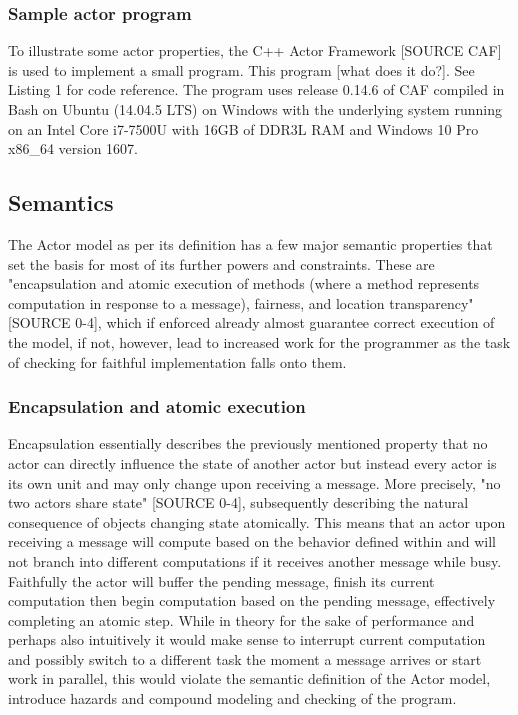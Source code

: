 \documentclass[A4]{article}
\begin{document}
\subsubsection{Sample actor program}
To illustrate some actor properties, the C++ Actor Framework [SOURCE CAF] is used to implement a small program. This program [what does it do?]. See Listing 1 for code reference. The program uses release 0.14.6 of CAF compiled in Bash on Ubuntu (14.04.5 LTS) on Windows with the underlying system running on an Intel Core i7-7500U with 16GB of DDR3L RAM and Windows 10 Pro x86\_64 version 1607. 

\subsection{Semantics}
The Actor model as per its definition has a few major semantic properties that set the basis for most of its further powers and constraints. These are "encapsulation and atomic execution of methods (where a method represents computation in response to a message), fairness, and location transparency" [SOURCE 0-4], which if enforced already almost guarantee correct execution of the model, if not, however, lead to increased work for the programmer as the task of checking for faithful implementation falls onto them. 
\subsubsection{Encapsulation and atomic execution}
Encapsulation essentially describes the previously mentioned property that no actor can directly influence the state of another actor but instead every actor is its own unit and may only change upon receiving a message. More precisely, "no two actors share state" [SOURCE 0-4], subsequently describing the natural consequence of objects changing state atomically. This means that an actor upon receiving a message will compute based on the behavior defined within and will not branch into different computations if it receives another message while busy. Faithfully the actor will buffer the pending message, finish its current computation then begin computation based on the pending message, effectively completing an atomic step. 
While in theory for the sake of performance and perhaps also intuitively it would make sense to interrupt current computation and possibly switch to a different task the moment a message arrives or start work in parallel, this would violate the semantic definition of the Actor model, introduce hazards and compound modeling and checking of the program. 
\end{document}
